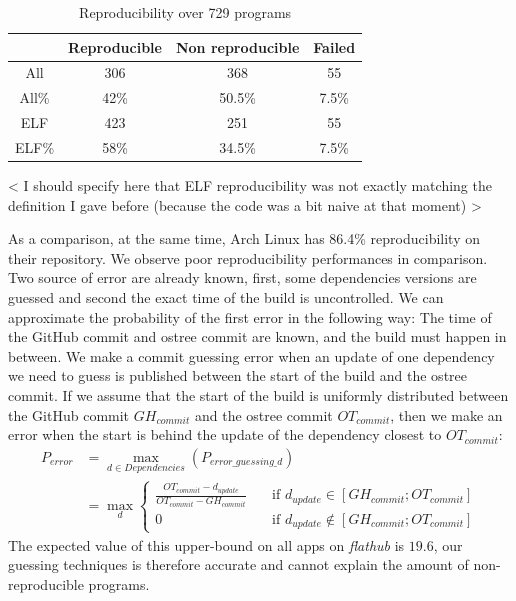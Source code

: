 \documentclass[a4paper,11pt,oneside]{report}
\theoremstyle{definition}
\newcommand{\fh}{\emph{flathub}\xspace}
\begin{document}
\begin{table}[h]
    \centering
        \begin{tabular}{|c|c|c|c|}
            \hline
            & Reproducible & Non reproducible & Failed\\
            \hline
            All & 306 & 368 & 55\\
            \hline
            All\% & 42\% & 50.5\% & 7.5\% \\
            \hline
            ELF & 423 & 251 & 55\\
            \hline
            ELF\% & 58\% & 34.5\% & 7.5\% \\
            \hline
        \end{tabular}
    \caption{Reproducibility over 729 programs}
    \label{tab:rebuild-all}
\end{table}

< I should specify here that ELF reproducibility was not exactly matching the definition I gave before (because the code was a bit naive at that moment) >

As a comparison, at the same time, Arch Linux has 86.4\% reproducibility on
their repository\cite{arch-rebuilderd}. We observe poor reproducibility
performances in comparison. Two source of error are already known, first, some
dependencies versions are guessed and second the exact time of the build is
uncontrolled. We can approximate the probability of the first error in the
following way: The time of the GitHub commit and ostree commit are known, and
the build must happen in between. We make a commit guessing error when an
update of one dependency we need to guess is published between the start of the
build and the ostree commit. If we assume that the start of the build is
uniformly distributed between the GitHub commit $GH_{commit}$ and the ostree
commit $OT_{commit}$, then we make an error when the start is behind the update
of the dependency closest to $OT_{commit}$:
\begin{align}
    P_{error} &= \max_{d \in Dependencies}(P_{error\_guessing\_d}) \\
              &= \max_{d}
              \begin{cases}
                \frac{OT_{commit} - d_{update}}{OT_{commit} -
                    GH_{commit}}  & \quad \text{if } d_{update}
                    \in [GH_{commit}; OT_{commit}] \\
                0  & \quad \text{if } d_{update}
                  \notin [GH_{commit}; OT_{commit}]
              \end{cases}
\end{align}
The expected value of this upper-bound on all apps on \fh is $19.6$, our
guessing techniques is therefore accurate and cannot explain the amount of
non-reproducible programs.
\end{document}
